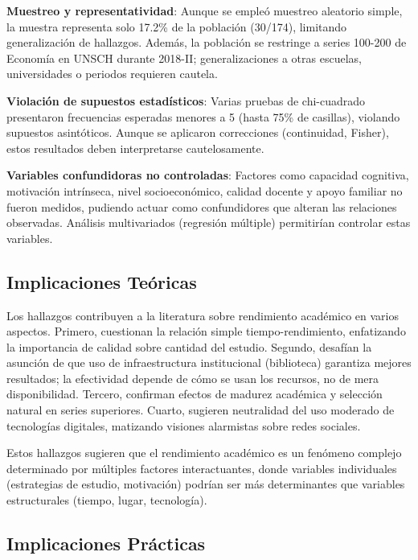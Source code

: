 \documentclass[
  stu,
  floatsintext,
  longtable,
  a4paper,
  nolmodern,
  notxfonts,
  notimes,
  12pt,
  colorlinks=true,linkcolor=blue,citecolor=blue,urlcolor=blue]{apa7}
\begin{document}
\textbf{Muestreo y representatividad}: Aunque se empleó muestreo
aleatorio simple, la muestra representa solo 17.2\% de la población
(30/174), limitando generalización de hallazgos. Además, la población se
restringe a series 100-200 de Economía en UNSCH durante 2018-II;
generalizaciones a otras escuelas, universidades o periodos requieren
cautela.

\textbf{Violación de supuestos estadísticos}: Varias pruebas de
chi-cuadrado presentaron frecuencias esperadas menores a 5 (hasta 75\%
de casillas), violando supuestos asintóticos. Aunque se aplicaron
correcciones (continuidad, Fisher), estos resultados deben interpretarse
cautelosamente.

\textbf{Variables confundidoras no controladas}: Factores como capacidad
cognitiva, motivación intrínseca, nivel socioeconómico, calidad docente
y apoyo familiar no fueron medidos, pudiendo actuar como confundidores
que alteran las relaciones observadas. Análisis multivariados (regresión
múltiple) permitirían controlar estas variables.

\subsection{Implicaciones Teóricas}\label{implicaciones-teuxf3ricas}

Los hallazgos contribuyen a la literatura sobre rendimiento académico en
varios aspectos. Primero, cuestionan la relación simple
tiempo-rendimiento, enfatizando la importancia de calidad sobre cantidad
del estudio. Segundo, desafían la asunción de que uso de infraestructura
institucional (biblioteca) garantiza mejores resultados; la efectividad
depende de cómo se usan los recursos, no de mera disponibilidad.
Tercero, confirman efectos de madurez académica y selección natural en
series superiores. Cuarto, sugieren neutralidad del uso moderado de
tecnologías digitales, matizando visiones alarmistas sobre redes
sociales.

Estos hallazgos sugieren que el rendimiento académico es un fenómeno
complejo determinado por múltiples factores interactuantes, donde
variables individuales (estrategias de estudio, motivación) podrían ser
más determinantes que variables estructurales (tiempo, lugar,
tecnología).

\subsection{Implicaciones Prácticas}\label{implicaciones-pruxe1cticas}
\end{document}
